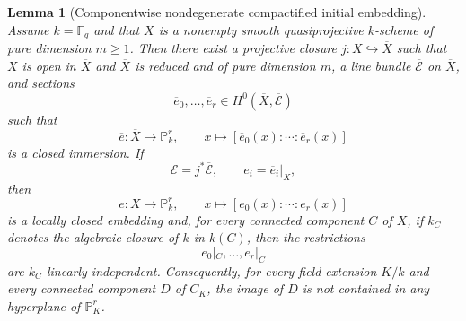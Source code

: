 \documentclass{lms}
\newtheorem{lemma}[theorem]{Lemma}
\newcommand{\F}{\mathbb F}
\newcommand{\PP}{\mathbb P}
\newcommand{\EE}{\mathcal E}
\newcommand{\barX}{\overline{X}}
\begin{document}
\begin{lemma}[Componentwise nondegenerate compactified initial embedding]\label{lem:initial}
Assume $k=\F_q$ and that $X$ is a nonempty smooth quasiprojective $k$-scheme of pure dimension $m\ge1$.  Then there exist a projective closure $j:X\hookrightarrow\barX$ such that $X$ is open in $\barX$ and $\barX$ is reduced and of pure dimension $m$, a line bundle $\overline{\EE}$ on $\barX$, and sections
\[
        \overline e_0,\ldots,\overline e_r\in H^0(\barX,\overline{\EE})
\]
such that
\[
        \overline e:\barX\longrightarrow\PP^r_k,
        \qquad
        x\longmapsto[\overline e_0(x):\cdots:\overline e_r(x)]
\]
is a closed immersion.  If
\[
        \EE=j^*\overline{\EE},
        \qquad
        e_i=\overline e_i|_X,
\]
then
\[
        e:X\longrightarrow\PP^r_k,
        \qquad
        x\longmapsto[e_0(x):\cdots:e_r(x)]
\]
is a locally closed embedding and, for every connected component $C$ of $X$, if $k_C$ denotes the algebraic closure of $k$ in $k(C)$, then the restrictions
\[
        e_0|_C,\ldots,e_r|_C
\]
are $k_C$-linearly independent.  Consequently, for every field extension $K/k$ and every connected component $D$ of $C_K$, the image of $D$ is not contained in any hyperplane of $\PP^r_K$.
\end{lemma}
\end{document}
